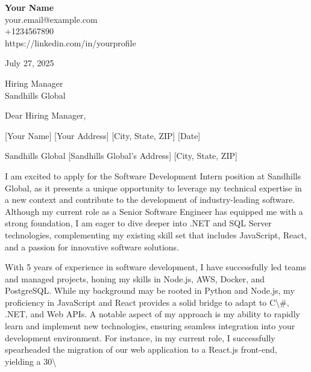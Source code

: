 \documentclass[letterpaper,11pt]{article}
\begin{document}
\begin{flushleft}
\textbf{\large Your Name} \\
your.email@example.com \\
+1234567890 \\
https://linkedin.com/in/yourprofile
\end{flushleft}

\vspace{0.5in}

July 27, 2025

\vspace{0.25in}

Hiring Manager \\
Sandhills Global \\

\vspace{0.25in}

Dear Hiring Manager,

\vspace{0.1in}

[Your Name]  
[Your Address]  
[City, State, ZIP]  
[Date]

Sandhills Global  
[Sandhills Global's Address]  
[City, State, ZIP]

I am excited to apply for the Software Development Intern position at Sandhills Global, as it presents a unique opportunity to leverage my technical expertise in a new context and contribute to the development of industry-leading software. Although my current role as a Senior Software Engineer has equipped me with a strong foundation, I am eager to dive deeper into .NET and SQL Server technologies, complementing my existing skill set that includes JavaScript, React, and a passion for innovative software solutions.

With 5 years of experience in software development, I have successfully led teams and managed projects, honing my skills in Node.js, AWS, Docker, and PostgreSQL. While my background may be rooted in Python and Node.js, my proficiency in JavaScript and React provides a solid bridge to adapt to C\textbackslash{}#, .NET, and Web APIs. A notable aspect of my approach is my ability to rapidly learn and implement new technologies, ensuring seamless integration into your development environment. For instance, in my current role, I successfully spearheaded the migration of our web application to a React.js front-end, yielding a 30\textbackslash{}%
\end{document}

